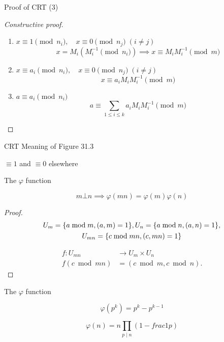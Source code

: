 \begin{frame}{Proof of CRT (3)}
  \begin{proof}[Constructive proof]
	\begin{enumerate}
	  \item $x \equiv 1 \pmod{n_i}, \quad x \equiv 0 \pmod{n_j}\; (i \neq j)$
		\[
		  x = M_i(M_i^{-1} \pmod{n_i}) \implies x \equiv M_iM_i^{-1} \pmod{m}
		\]
	  \item $x \equiv a_i \pmod{n_i}, \quad x \equiv 0 \pmod{n_j}\; (i \neq j)$
		\[
		  x \equiv a_i M_iM_i^{-1} \pmod{m}
		\]
	  \item $a \equiv a_i \pmod{n_i}$
		\[
		  a \equiv \sum_{1 \le i \le k} a_i M_iM_i^{-1} \pmod{m}
		\]
	\end{enumerate}
  \end{proof}
\end{frame}
\begin{frame}{CRT}
  Meaning of Figure 31.3

  $\equiv 1$ and $\equiv 0$ elsewhere
\end{frame}
\begin{frame}{The $\varphi$ function}
  \begin{theorem}
	\[
	  m \bot n \implies \varphi(mn) = \varphi(m) \varphi(n)
	\]
  \end{theorem}

  \begin{proof}
	\begin{gather*}
	  U_{m} = \{a \bmod m, (a,m) = 1\}, U_{n} = \{a \bmod n, (a,n) = 1\}, \\
	  U_{mn} = \{c \bmod mn, (c, mn) = 1\}
	\end{gather*}

	\begin{align*}
	  f: U_{mn} &\to U_m \times U_n \\
	  f(c \bmod mn) &= (c \bmod m, c \bmod n).
	\end{align*}
  \end{proof}
\end{frame}
\begin{frame}{The $\varphi$ function}
  \begin{theorem}
	\[
	  \varphi(p^k) = p^k - p^{k-1}
	\]

	\[
	  \varphi(n) = n \prod_{p \mid n} (1 - frac{1}{p})
	\]
  \end{theorem}
\end{frame}
